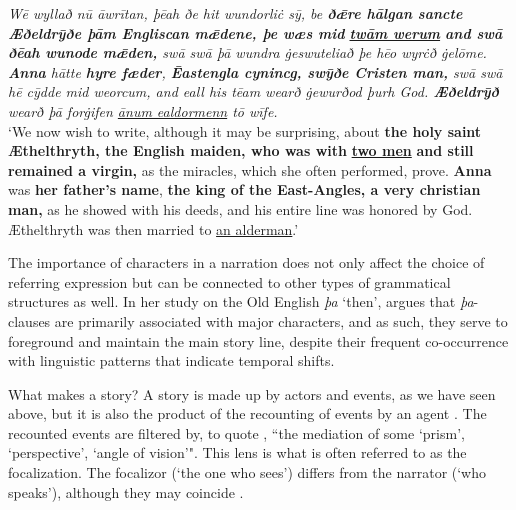 \documentclass[output=paper,colorlinks,citecolor=brown]{langscibook}
\begin{document}
\ea \label{ex:ch1.3}
\textit{Wē wyllað nū āwrītan, þēah ðe hit wundorliċ sȳ, be \textbf{ðǣre hālgan sancte Æðeldrȳðe þām Engliscan mǣdene, þe wæs mid} \underline{\textbf{twām werum}} \textbf{and swā ðēah wunode mǣden,} swā swā þā wundra ġeswuteliað þe hēo wyrċð ġelōme. \textbf{Anna} hātte \textbf{hyre fæder}, \textbf{Ēastengla cynincg, swȳðe Cristen man,} swā swā hē cȳdde mid weorcum, and eall his tēam wearð ġewurðod þurh God. \textbf{Æðeldrȳð} wearð þā forġifen \underline{ānum ealdormenn} tō wīfe.} \\
\glt `We now wish to write, although it may be surprising, about \textbf{the holy saint Æthelthryth, the English maiden, who was with} \underline{\textbf{two men}} \textbf{and still remained a virgin,} as the miracles, which she often performed, prove. \textbf{Anna} was \textbf{her father's name}, \textbf{the king of the East-Angles, a very christian man,} as he showed with his deeds, and his entire line was honored by God. Æthelthryth was then married to \underline{an alderman}.'\\
\hfill \citep[255, translation my own]{Baker2012}
\z 

The importance of characters in a narration does not only affect the choice of referring expression but can be connected to other types of grammatical structures as well. In her study on the Old English \textit{þa} `then', \citet{Warvik2013} argues that \textit{þa}-clauses are primarily associated with major characters, and as such, they serve to foreground and maintain the main story line, despite their frequent co-occurrence with linguistic patterns that indicate temporal shifts.

What makes a story? A story is made up by actors and events, as we have seen above, but it is also the product of the recounting of events by an agent \citep[58]{Prince1987}. The recounted events are filtered by, to quote \citet[70]{RimmonKenan1983}, ``the mediation of some `prism', `perspective', `angle of vision'". This lens is what is often referred to as the focalization. The focalizor (`the one who sees') differs from the narrator (`who speaks'), although they may coincide \citep{Genette1972, RimmonKenan1983}. 
\end{document}
